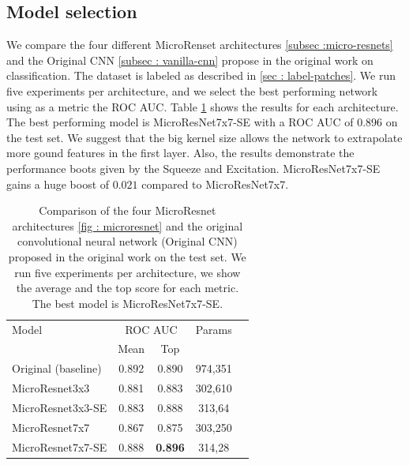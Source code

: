 \documentclass[../document.tex]{subfiles}
\begin{document}
\subsection{Model selection}
We compare the four different MicroRenset architectures \ref{subsec :micro-resnets} and the Original CNN \ref{subsec : vanilla-cnn} propose in the original work \cite{omar2018traversability} on classification. The dataset is labeled as described in \ref{sec : label-patches}. We run five experiments per architecture, and we select the best performing network using as a metric the ROC AUC. Table \ref{tab : models-results-comparison} shows the results for each architecture. The best performing model is MicroResNet7x7-SE with a ROC AUC of 0.896 on the test set. We suggest that the big kernel size allows the network to extrapolate more gound features in the first layer. Also, the results demonstrate the performance boots given by the Squeeze and Excitation. MicroResNet7x7-SE  gains a huge boost of $0.021$ compared to MicroResNet7x7.
\begin{table}[ht]
  \centering
  \begin{tabular}{@{}lcccc@{}}
    \toprule
    Model & \multicolumn{2}{c}{ROC AUC} & Params \\ 
    \cline{1-4}
    & Mean & Top &  \\ 
    \cline{1-4}
    Original (baseline)  & 0.892& 0.890 &  974,351 \\
    MicroResnet3x3 & 0.881 & 0.883 & 302,610 \\
    MicroResnet3x3-SE & 0.883 & 0.888 & 313,64\\
    MicroResnet7x7 & 0.867 & 0.875 &  303,250\\
    MicroResnet7x7-SE &0.888 & \textbf{0.896} & 314,28\\
    \bottomrule   
  \end{tabular}
  \caption{Comparison of the four MicroResnet architectures \ref{fig : microresnet} and the original convolutional neural network (Original CNN) proposed in the original work \cite{omar2018traversability} on the test set. We run five experiments per architecture, we show the average and the top score for each metric. The best model is MicroResNet7x7-SE.}
  \label{tab : models-results-comparison}
\end{table}
\end{document}
